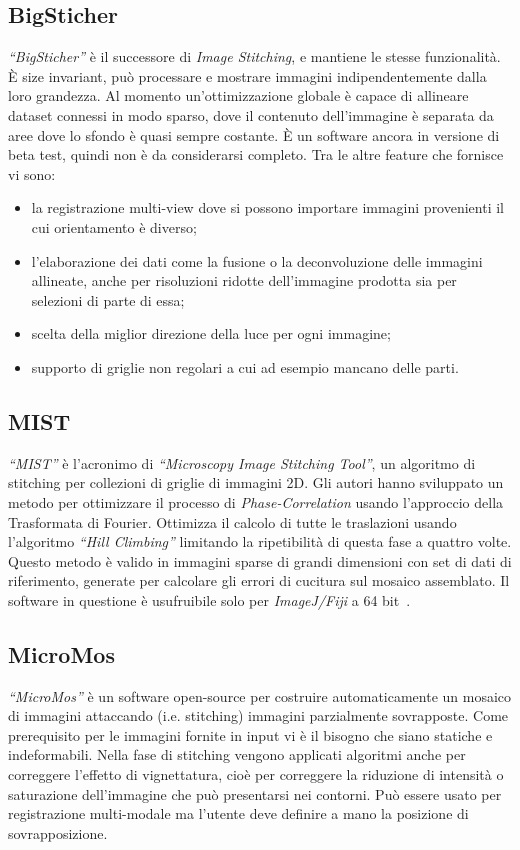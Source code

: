 \subsection{BigSticher}
\noindent \textit{``BigSticher''} è il successore di \textit{Image Stitching}, e mantiene le stesse funzionalità. È size invariant, può processare e mostrare immagini indipendentemente dalla loro grandezza. Al momento un'ottimizzazione globale è capace di allineare dataset connessi in modo sparso, dove il contenuto dell'immagine è separata da aree dove lo sfondo è quasi sempre costante. È un software ancora in versione di beta test, quindi non è da considerarsi completo. Tra le altre feature che fornisce vi sono:
\begin{itemize}
    \item la registrazione multi-view dove si possono importare immagini provenienti il cui orientamento è diverso;
    \item l'elaborazione dei dati come la fusione o la deconvoluzione delle immagini allineate, anche per risoluzioni ridotte dell'immagine prodotta sia per selezioni di parte di essa;
    \item scelta della miglior direzione della luce per ogni immagine;
    \item supporto di griglie non regolari a cui ad esempio mancano delle parti.
\end{itemize}

\subsection{MIST}
\noindent \textit{``MIST''} è l'acronimo di \textit{``Microscopy Image Stitching Tool''}, un algoritmo di stitching per collezioni di griglie di immagini 2D. Gli autori hanno sviluppato un metodo per ottimizzare il processo di \textit{Phase-Correlation} usando l'approccio della Trasformata di Fourier. Ottimizza il calcolo di tutte le traslazioni usando l'algoritmo \textit{``Hill Climbing''} limitando la ripetibilità di questa fase a quattro volte. Questo metodo è valido in immagini sparse di grandi dimensioni con set di dati di riferimento, generate per calcolare gli errori di cucitura sul mosaico assemblato. Il software in questione è usufruibile solo per \textit{ImageJ/Fiji} a 64 bit~\cite{MIST}.

\subsection{MicroMos}
\noindent \textit{``MicroMos''} è un software open-source per costruire automaticamente un mosaico di immagini attaccando (i.e. stitching) immagini parzialmente sovrapposte. Come prerequisito per le immagini fornite in input vi è il bisogno che siano statiche e indeformabili. Nella fase di stitching  vengono applicati algoritmi anche per correggere l'effetto di vignettatura, cioè per correggere la riduzione di intensità o saturazione dell'immagine che può presentarsi nei contorni. Può essere usato per registrazione multi-modale ma l’utente deve definire a mano la posizione di sovrapposizione.

